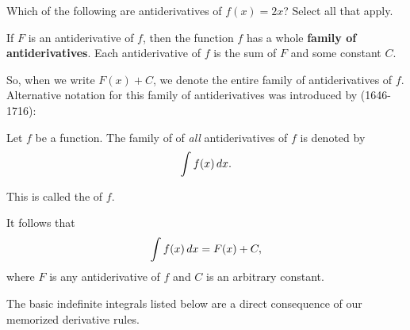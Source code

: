 \documentclass{ximera}
\begin{document}
\begin{question}
  Which of the following are antiderivatives of $f(x)=2x$? Select all that apply.
  \begin{prompt}
  \begin{selectAll}
  \end{selectAll}
  \end{prompt}
\end{question}


\begin{theorem}\label{theorem:FOA}

If $F$ is an antiderivative of $f$, then the function $f$ has a whole \textbf{family of antiderivatives}. Each antiderivative of $f$ is the sum of $F$ and some constant $C$.
\end{theorem}

So, when we write $F(x)+C$, we denote the entire family of
antiderivatives of $f$.  Alternative notation for this family of
antiderivatives was introduced by  (1646-1716):
 
\begin{definition}
Let $f$ be a function. The family of of \emph{all} antiderivatives of $f$ is denoted by
\[
\int f(x) \mathop{}\!d x. 
\]

This is called the
 of $f$.
\end{definition}
It follows that
\[
\int f(x) \mathop{}\!d x =F(x)+C,
\]
where $F$ is any antiderivative of $f$ and $C$ is an arbitrary constant.


The basic indefinite integrals listed below are a direct consequence of our memorized derivative rules.
\end{document}
